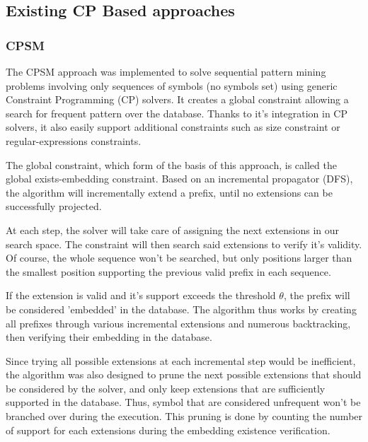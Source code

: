 \documentclass{eplmastersthesis}
\begin{document}
\subsection{Existing CP Based approaches}
\subsubsection{CPSM}

The CPSM approach \cite{negrevergne2015constraint} was implemented to solve sequential pattern mining problems involving only sequences of symbols (no symbols set) using generic Constraint Programming (CP) solvers. It creates a global constraint allowing a search for frequent pattern over the database. Thanks to it's integration in CP solvers, it also easily support additional constraints such as size constraint or regular-expressions constraints. \newline

The global constraint, which form of the basis of this approach, is called the global exists-embedding constraint. Based on an incremental propagator (DFS), the algorithm will incrementally extend a prefix, until no extensions can be successfully projected. \newline

At each step, the solver will take care of assigning the next extensions in our search space. The constraint will then search said extensions to verify it's validity. Of course, the whole sequence won't be searched, but only positions larger than the smallest position supporting the previous valid prefix in each sequence. \newline

If the extension is valid and it's support exceeds the threshold $\theta$, the prefix will be considered 'embedded' in the database. The algorithm thus works by creating all prefixes through various incremental extensions and numerous backtracking, then verifying their embedding in the database. \newline

Since trying all possible extensions at each incremental step would be inefficient, the algorithm was also designed to prune the next possible extensions that should be considered by the solver, and only keep extensions that are sufficiently supported in the database. Thus, symbol that are considered unfrequent won't be branched over during the execution. This pruning is done by counting the number of support for each extensions during the embedding existence verification. \newline
\end{document}
